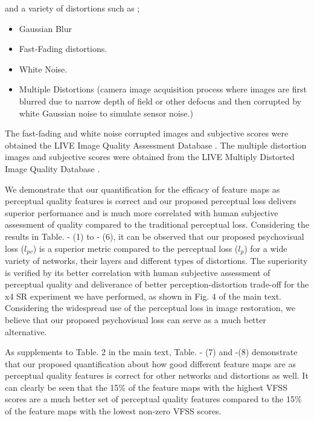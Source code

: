\documentclass[10pt,twocolumn,letterpaper]{article}
\begin{document}
and a variety of distortions such as ;
\begin{itemize}
 \item{Gaussian Blur}
 \item Fast-Fading distortions.
 \item White Noise.
 \item Multiple Distortions (camera image acquisition process where images are first blurred due to narrow depth of field or other defocus and then corrupted by white Gaussian noise to simulate sensor noise.)
\end{itemize}

The fast-fading and white noise corrupted images and subjective scores were obtained the LIVE Image Quality Assessment Database \cite{4}. The multiple distortion images and subjective scores were obtained from the LIVE Multiply Distorted Image Quality Database \cite{36}.

We demonstrate that our quantification for the efficacy of feature maps as perceptual quality features is correct and our proposed perceptual loss delivers superior performance and is much more correlated with human subjective assessment of quality compared to the traditional perceptual loss. Considering the results in Table. - (1) to - (6), it can be observed that our proposed psychovisual loss (\textbf{$l_{pv}$}) is a superior metric compared to the perceptual loss (\textbf{$l_{p}$}) for a wide variety of networks, their layers and different types of distortions. The superiority is verified by its better correlation with human subjective assessment of perceptual quality and deliverance of better perception-distortion trade-off for the x4 SR experiment we have performed, as shown in Fig. 4 of the main text. Considering the widespread use of the perceptual loss in image restoration, we believe that our proposed psychovisual loss can serve as a much better alternative.

As supplements to Table. 2 in the main text, Table. - (7) and -(8) demonstrate that our proposed quantification about how good different feature maps are as perceptual quality features is correct for other networks and distortions as well. It can clearly be seen that the 15\% of the feature maps with the highest VFSS scores are a much better set of perceptual quality features compared to the 15\% of the feature maps with the lowest non-zero VFSS scores.
\end{document}
